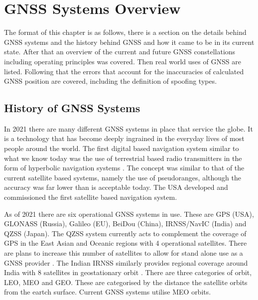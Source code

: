 
\chapter{GNSS Systems Overview} %

\label{Chapter2} %

The format of this chapter is as follows, there is a section on the details behind GNSS systems and the history behind GNSS and how it came to be in its current state. After that
an overview of the current and future GNSS constellations including operating principles was covered. Then real world uses of GNSS are listed. Following that the errors
that account for the inaccuracies of calculated GNSS position are covered, including the definition of spoofing types.


\section{History of GNSS Systems} \label{sec:GNSSHistory}
In 2021 there are many different GNSS systems in place that service the globe. It is a technology that has become deeply ingrained in the everyday lives of most
people around the world. The first digital based navigation system similar to what we know today was the use of terrestrial based radio transmitters in the form of
hyperbolic navigation systems \cite{RN68}. The concept was
similar to that of the current satellite based systems, namely the use of pseudoranges, although the accuracy was far lower than is acceptable today. The USA developed
and commissioned the first satellite based navigation system.

As of 2021 there are six operational GNSS systems in use. These are GPS (USA), GLONASS (Russia), Galileo (EU), BeiDou (China), IRNSS/NavIC (India) and QZSS (Japan). The
QZSS system currently acts to complement the coverage of GPS in the East Asian and Oceanic regions with 4 operational satellites. There are plans to increase this number
of satellites to allow for stand alone use as a GNSS provider \cite{RN47}. The Indian IRNSS similarly provides regional coverage around India with 8 satellites in
geostationary orbit \cite{RN55} . There are three categories of orbit, LEO, MEO and GEO. These are categorised by the distance the satellite orbits from the eartch surface.
Current GNSS systems utilise MEO orbits.

